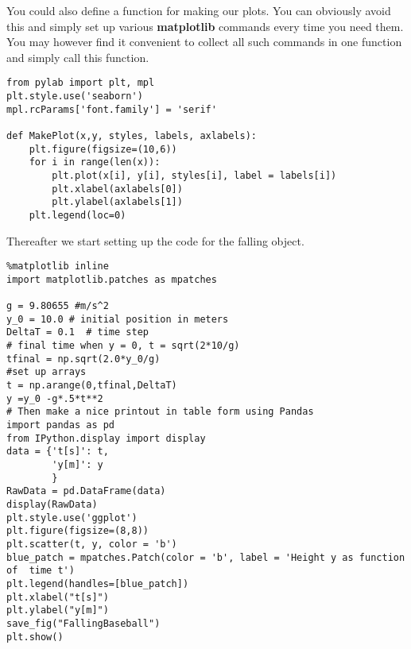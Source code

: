 \documentclass[%
oneside,                 %
final,                   %
10pt]{article}
\begin{document}
You could also define a function for making our plots. You
can obviously avoid this and simply set up various \textbf{matplotlib}
commands every time you need them. You may however find it convenient
to collect all such commands in one function and simply call this
function.













\begin{verbatim}
from pylab import plt, mpl
plt.style.use('seaborn')
mpl.rcParams['font.family'] = 'serif'

def MakePlot(x,y, styles, labels, axlabels):
    plt.figure(figsize=(10,6))
    for i in range(len(x)):
        plt.plot(x[i], y[i], styles[i], label = labels[i])
        plt.xlabel(axlabels[0])
        plt.ylabel(axlabels[1])
    plt.legend(loc=0)

\end{verbatim}


Thereafter we start setting up the code for the falling object.






























\begin{verbatim}
%matplotlib inline
import matplotlib.patches as mpatches

g = 9.80655 #m/s^2
y_0 = 10.0 # initial position in meters
DeltaT = 0.1  # time step
# final time when y = 0, t = sqrt(2*10/g)
tfinal = np.sqrt(2.0*y_0/g)
#set up arrays 
t = np.arange(0,tfinal,DeltaT)
y =y_0 -g*.5*t**2
# Then make a nice printout in table form using Pandas
import pandas as pd
from IPython.display import display
data = {'t[s]': t,
        'y[m]': y
        }
RawData = pd.DataFrame(data)
display(RawData)
plt.style.use('ggplot')
plt.figure(figsize=(8,8))
plt.scatter(t, y, color = 'b')
blue_patch = mpatches.Patch(color = 'b', label = 'Height y as function of  time t')
plt.legend(handles=[blue_patch])
plt.xlabel("t[s]")
plt.ylabel("y[m]")
save_fig("FallingBaseball")
plt.show()

\end{verbatim}
\end{document}
